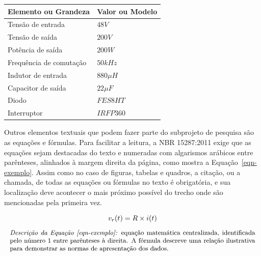\documentclass[12pt, a4paper]{article}
\begin{document}
\begin{quadro}[h]
	\fontsize{10}{12}
	\centering
	\caption{Dimensionamento dos elementos de um conversor \textit{boost}}
	\label{qdr-exemplo}
	\begin{tabular}{|p{60mm}|p{60mm}|}
		\hline
		\rowcolor{gray!25}
		\centering \textbf{Elemento ou Grandeza} &  \centering \textbf{Valor ou Modelo}
		\tabularnewline
		\hline
		Tensão de entrada 		& $48 V$
		\\\hline
		Tensão de saída 		& $200 V$
		\\\hline
		Potência de saída 		& $200 W$
		\\\hline
		Frequência de comutação	& $50 kHz$
		\\\hline
		Indutor de entrada 		& $880 \mu H$
	\\\hline
		Capacitor de saída 		& $22 \mu F$
	\\\hline
		Diodo					& $FES8HT$
		\\\hline
		Interruptor				& $IRFP360$	
	\\\hline
	\end{tabular}
	\vspace{5pt}
	\caption*{Fonte: \cite{menegaz:thesis2005}.}
	\caption*{\textit{Descrição do Quadro~\ref{qdr-exemplo}:} o quadro apresenta duas colunas e nove linhas com bordas pretas visíveis em todas as divisões, com dados ilustrativos para demonstrar as normas de apresentação de dados.}
\end{quadro}

Outros elementos textuais que podem fazer parte do subprojeto de pesquisa são as equações e fórmulas. Para facilitar a leitura, a NBR 15287:2011 exige que as equações sejam destacadas do texto e numeradas com algarismos arábicos entre parênteses, alinhados à margem direita da página, como mostra a Equação~\eqref{eqn-exemplo}. Assim como no caso de figuras, tabelas e quadros, a citação, ou a chamada, de todas as equações ou fórmulas no texto é obrigatória, e sua localização deve acontecer o mais próximo possível do trecho onde são mencionadas pela primeira vez.

\begin{gather}
	\label{eqn-exemplo}
	v_{r}(t) = R \times i(t) \\[0.2cm]
	\parbox{\textwidth}{\small\textit{Descrição da Equação~\eqref{eqn-exemplo}:} equação matemática centralizada, identificada pelo número 1 entre parênteses à direita. A fórmula descreve uma relação ilustrativa para demonstrar as normas de apresentação dos dados.}\nonumber
\end{gather}
\end{document}
